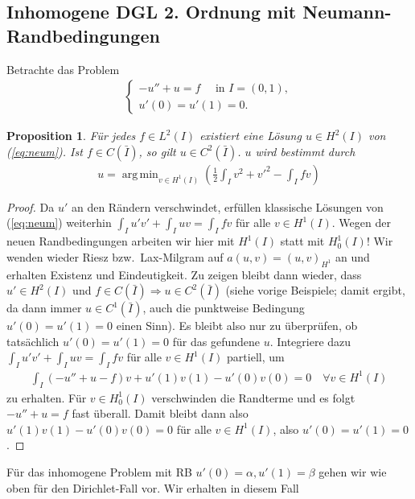 \documentclass[twoside]{article}
\newtheorem{proposition}[theorem]{Proposition}
\theoremstyle{definition}
\DeclareMathOperator*{\argmin}{arg\,min}
\begin{document}
\subsection{Inhomogene DGL 2. Ordnung mit Neumann-Randbedingungen}
Betrachte das Problem
\begin{align}
\begin{cases}
-u'' + u = f \quad \text{ in } I = (0,1),\\
u'(0)=u'(1)=0.
\end{cases} \label{eq:neum}
\end{align}
\begin{proposition}
Für jedes $f \in L^2(I)$ existiert eine Lösung $u \in H^2(I)$ von (\ref{eq:neum}). Ist $f \in C(\bar{I})$, so gilt $u \in C^2(\bar{I})$. $u$ wird bestimmt durch
\begin{align*}
u = \argmin_{v \in H^1(I)} \left(\frac{1}{2} \int_I v^2+v'^2 - \int_I f v \right)
\end{align*}
\end{proposition}
\begin{proof}
Da $u'$ an den Rändern verschwindet, erfüllen klassische Lösungen von (\ref{eq:neum}) weiterhin $\int_I u'v' + \int_I uv = \int_I fv$ für alle $v \in H^1(I)$. Wegen der neuen Randbedingungen arbeiten wir hier mit $H^1(I)$ statt mit $H^1_0(I)$! Wir wenden wieder Riesz bzw.\ Lax-Milgram auf $a(u,v) = (u,v)_{H^1}$ an und erhalten Existenz und Eindeutigkeit. Zu zeigen bleibt dann wieder, dass $u' \in H^2(I)$ und $f \in C(\bar{I}) \Rightarrow u \in C^2(\bar{I})$ (siehe vorige Beispiele; damit ergibt, da dann immer $u \in C^1(\bar{I})$, auch die punktweise Bedingung $u'(0)=u'(1)=0$ einen Sinn). Es bleibt also nur zu überprüfen, ob tatsächlich $u'(0)=u'(1)=0$ für das gefundene $u$. Integriere dazu  $\int_I u'v' + \int_I uv = \int_I fv$ für alle $v \in H^1(I)$ partiell, um
\begin{align*}
\int_I (-u'' +u - f)v  + u'(1)v(1)-u'(0)v(0) = 0 \quad \forall v \in H^1(I)
\end{align*}
zu erhalten. Für $v \in H_0^1(I)$ verschwinden die Randterme und es folgt $-u'' +u = f$ fast überall. Damit bleibt dann also $u'(1)v(1)-u'(0)v(0) = 0$ für alle $v \in H^1(I)$, also $u'(0)=u'(1)=0$.
\end{proof}
Für das inhomogene Problem mit RB $u'(0)=\alpha, u'(1)=\beta$ gehen wir wie oben für den Dirichlet-Fall vor. Wir erhalten in diesem Fall
\end{document}
